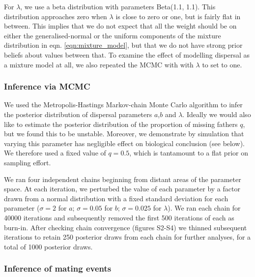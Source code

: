 \documentclass[10pt, a4paper, twocolumn]{article} %
\begin{document}
For $\lambda$, we use a beta distribution with parameters Beta(1.1, 1.1).
This distribution approaches zero when $\lambda$ is close to zero or one, but is fairly flat in between.
This implies that we do not expect that all the weight should be on either the generalised-normal or the uniform components of the mixture distribution in eqn. \ref{eqn:mixture_model}, but that we do not have strong prior beliefs about values between that.
To examine the effect of modelling dispersal as a mixture model at all, we also repeated the MCMC with with $\lambda$ to set to one.

\subsubsection{Inference via MCMC}

We used the Metropolis-Hastings Markov-chain Monte Carlo algorithm to infer the posterior distribution of dispersal parameters $a$,$b$ and $\lambda$.
Ideally we would also like to estimate the posterior distribution of the proportion of missing fathers $q$, but we found this to be unstable.
Moreover, we demonstrate by simulation that varying this parameter has negligible effect on biological conclusion (see below).
We therefore used a fixed value of $q=0.5$, which is tantamount to a flat prior on sampling effort. 

We ran four independent chains beginning from distant areas of the parameter space.
At each iteration, we perturbed the value of each parameter by a factor drawn from a normal distribution with a fixed standard deviation for each parameter ($\sigma= 2$ for $a$; $\sigma= 0.05$ for $b$; $\sigma= 0.025$ for $\lambda$).
We ran each chain for 40000 iterations and subsequently removed the first 500 iterations of each as burn-in.
After checking chain convergence (figures S2-S4) we thinned subsequent iterations to retain 250 posterior draws from each chain for further analyses, for a total of 1000 posterior draws.

\subsubsection{Inference of mating events}
\end{document}
